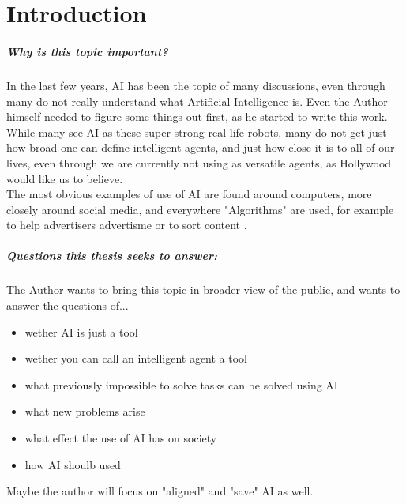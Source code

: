 \chapter{Introduction}
\paragraph{Why is this topic important?}
In the last few years, AI has been the topic of many discussions, even through many do not really understand what Artificial Intelligence is.
Even the Author himself needed to figure some things out first, as he started to write this work.\\
While many see AI as these super-strong real-life robots, many do not get just how broad one can define intelligent agents, and just how close it is to all of our lives, even through we are currently not using as versatile agents, as Hollywood would like us to believe.\\
The most obvious examples of use of AI are found around computers, more closely around social media, and everywhere "Algorithms" are used, for example to help advertisers advertisme \cite{WerbungAufInstagram} or to sort content \cite{FunktioniertGoogleSucheSuchalgorithmen}.
\paragraph{Questions this thesis seeks to answer:}
The Author wants to bring this topic in broader view of the public, and wants to answer the questions of... 
\begin{itemize}
    \item wether AI is just a tool
    \item wether you can call an intelligent agent a tool
    \item what previously impossible to solve tasks can be solved using AI
    \item what new problems arise
    \item what effect the use of AI has on society
    \item how AI shoulb used
\end{itemize}
Maybe the author will focus on "aligned" and "save" AI as well.
